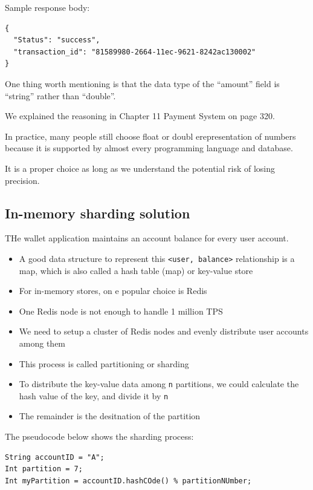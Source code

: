 \documentclass{report}
\theoremstyle{definition}
\let\oldsubsection\subsection
\renewcommand{\subsection}{\oldsubsection*}
\begin{document}
Sample response body:

\begin{lstlisting}
{
  "Status": "success",
  "transaction_id": "81589980-2664-11ec-9621-8242ac130002"
}
\end{lstlisting}

One thing worth mentioning is that the data type of the ``amount'' field is ``string'' rather than ``double''.

We explained the reasoning in Chapter 11 Payment System on page 320.

In practice, many people still choose float or doubl erepresentation of numbers because it is supported by almost every programming language and database.

It is a proper choice as long as we understand the potential risk of losing precision.

\subsection{In-memory sharding solution}

THe wallet application maintains an account balance for every user account.

\begin{itemize}
\item
A good data structure to represent this \lstinline|<user, balance>| relationship is a map, which is also called a hash table (map) or key-value store
\item
For in-memory stores, on e popular choice is Redis
\item
One Redis node is not enough to handle 1 million TPS
\item
We need to setup a cluster of Redis nodes and evenly distribute user accounts among them
\item
This process is called partitioning or sharding
\item
To distribute the key-value data among \lstinline|n| partitions, we could calculate the hash value of the key, and divide it by \lstinline|n|
\item
The remainder is the desitnation of the partition
\end{itemize}

The pseudocode below shows the sharding process:

\begin{lstlisting}
String accountID = "A";
Int partition = 7;
Int myPartition = accountID.hashCOde() % partitionNUmber;
\end{lstlisting}
\end{document}
